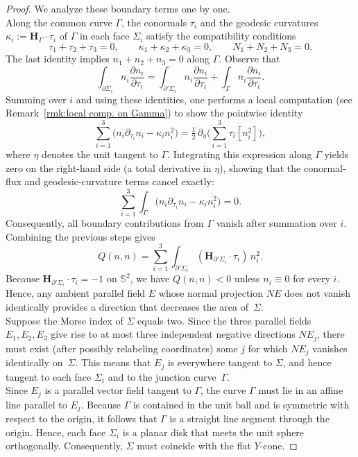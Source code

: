 \documentclass[11pt]{amsart}
\numberwithin{equation}{section}
\theoremstyle{theorem}
\theoremstyle{definition}
\numberwithin{equation}{section}
\begin{document}
\begin{proof}
We analyze these boundary terms one by one.\\
Along the common curve $\Gamma$, the conormals $\tau_i$ and the geodesic curvatures $\kappa_i := \boldsymbol{H}_{\Gamma}\!\cdot\!\tau_i$ of $\Gamma$ in each face $\Sigma_i$ satisfy the compatibility conditions
\[
\tau_1 + \tau_2 + \tau_3 = 0,
\qquad
\kappa_1 + \kappa_2 + \kappa_3 = 0,
\qquad
N_1 + N_2 + N_3 = 0.
\]
The last identity implies $n_1 + n_2 + n_3 = 0$ along $\Gamma$.
Observe that
\[
\int_{\partial\Sigma_i} n_i\frac{\partial n_i}{\partial \tau_i}
= \int_{\partial'\Sigma_i} n_i\frac{\partial n_i}{\partial \tau_i}
+ \int_{\Gamma} n_i\frac{\partial n_i}{\partial \tau_i}.
\]
 Summing over \(i\) and using these identities, one performs a local computation (see Remark~\ref{rmk:local comp. on Gamma}) to show the pointwise identity
\[
\sum_{i=1}^3 \big(n_i \partial_{\tau_i} n_i - \kappa_i n_i^2\big)
= \tfrac{1}{2}\,\partial_\eta \!\Big(\sum_{i=1}^3 \tau_i[n_i^2]\Big),
\]
where $\eta$ denotes the unit tangent to $\Gamma$. 
Integrating this expression along $\Gamma$ yields zero on the right-hand side (a total derivative in $\eta$), showing that the conormal-flux and geodesic-curvature terms cancel exactly:
\[
\sum_{i=1}^3 \int_\Gamma \big(n_i \partial_{\tau_i} n_i - \kappa_i n_i^2\big) = 0.
\]
Consequently, all boundary contributions from $\Gamma$ vanish after summation over $i$.\\
Combining the previous steps gives
\[
Q(n,n)
= \sum_{i=1}^3 \int_{\partial'\Sigma_i} 
(\boldsymbol{H}_{\partial'\Sigma_i}\!\cdot\!\tau_i)\,n_i^2.
\]
Because $\boldsymbol{H}_{\partial'\Sigma_i}\!\cdot\!\tau_i=-1$ on $\mathbb{S}^2$, we have $Q(n,n)<0$ unless $n_i\equiv 0$ for every $i$. 
Hence, any ambient parallel field $E$ whose normal projection $NE$ does not vanish identically provides a direction that decreases the area of~$\Sigma$.\\
Suppose the Morse index of $\Sigma$ equals two. 
Since the three parallel fields $E_1,E_2,E_3$ give rise to at most three independent negative directions $NE_j$, there must exist (after possibly relabeling coordinates) some $j$ for which $NE_j$ vanishes identically on~$\Sigma$. 
This means that $E_j$ is everywhere tangent to $\Sigma$, and hence tangent to each face $\Sigma_i$ and to the junction curve~$\Gamma$.\\
Since $E_j$ is a parallel vector field tangent to $\Gamma$,
the curve $\Gamma$ must lie in an affine line parallel to $E_j$.
Because $\Gamma$ is contained in the unit ball and is symmetric
with respect to the origin, it follows that $\Gamma$ is a straight
line segment through the origin. Hence, each face $\Sigma_i$ is a planar disk that meets the unit sphere orthogonally. 
Consequently, $\Sigma$ must coincide with the flat $Y$-cone.
\end{proof}
\end{document}
